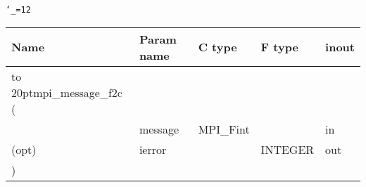 \begingroup\tt\catcode`\_=12
\begin{tabular}{lllll}
\toprule
\textrm{Name}&\textrm{Param name}&\textrm{C type}&\textrm{F type}&\textrm{inout}\\
\midrule
\hbox to 20pt{mpi_message_f2c (\hss} \\
&message&MPI_Fint&&in\\
(opt)&ierror&&INTEGER&out\\
)\\
\bottomrule
\end{tabular}
\endgroup

